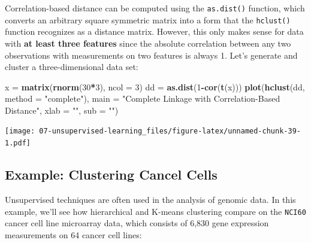 \documentclass[openany]{book}
\newenvironment{Shaded}{\begin{snugshade}}{\end{snugshade}}
\newcommand{\CommentTok}[1]{\textcolor[rgb]{0.56,0.35,0.01}{\textit{#1}}}
\newcommand{\DataTypeTok}[1]{\textcolor[rgb]{0.13,0.29,0.53}{#1}}
\newcommand{\DecValTok}[1]{\textcolor[rgb]{0.00,0.00,0.81}{#1}}
\newcommand{\KeywordTok}[1]{\textcolor[rgb]{0.13,0.29,0.53}{\textbf{#1}}}
\newcommand{\NormalTok}[1]{#1}
\newcommand{\OperatorTok}[1]{\textcolor[rgb]{0.81,0.36,0.00}{\textbf{#1}}}
\newcommand{\StringTok}[1]{\textcolor[rgb]{0.31,0.60,0.02}{#1}}
\begin{document}
Correlation-based distance can be computed using the \texttt{as.dist()} function, which converts an arbitrary square symmetric matrix into a form that
the \texttt{hclust()} function recognizes as a distance matrix. However, this only
makes sense for data with \textbf{at least three features} since the absolute correlation
between any two observations with measurements on two features is
always 1. Let's generate and cluster a three-dimensional data set:

\begin{Shaded}
\begin{Highlighting}[]
\NormalTok{x =}\StringTok{ }\KeywordTok{matrix}\NormalTok{(}\KeywordTok{rnorm}\NormalTok{(}\DecValTok{30}\OperatorTok{*}\DecValTok{3}\NormalTok{), }\DataTypeTok{ncol =} \DecValTok{3}\NormalTok{)}
\NormalTok{dd =}\StringTok{ }\KeywordTok{as.dist}\NormalTok{(}\DecValTok{1}\OperatorTok{-}\KeywordTok{cor}\NormalTok{(}\KeywordTok{t}\NormalTok{(x)))}
\KeywordTok{plot}\NormalTok{(}\KeywordTok{hclust}\NormalTok{(dd, }\DataTypeTok{method =} \StringTok{"complete"}\NormalTok{), }\DataTypeTok{main =} \StringTok{"Complete Linkage with Correlation-Based Distance"}\NormalTok{, }\DataTypeTok{xlab =} \StringTok{""}\NormalTok{, }\DataTypeTok{sub =} \StringTok{""}\NormalTok{)}
\end{Highlighting}
\end{Shaded}

\texttt{[image: 07-unsupervised-learning\_files/figure-latex/unnamed-chunk-39-1.pdf]}

\hypertarget{example-clustering-cancel-cells}{%
\subsection{Example: Clustering Cancel Cells}\label{example-clustering-cancel-cells}}

Unsupervised techniques are often used in the analysis of genomic data. In this example, we'll see how hierarchical and K-means clustering compare on the \texttt{NCI60} cancer cell line microarray data, which
consists of 6,830 gene expression measurements on 64 cancer cell lines:

\begin{Shaded}
\end{Shaded}
\end{document}

